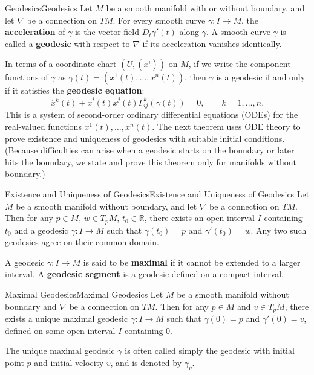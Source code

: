 \documentclass[../main.tex]{subfiles}
\begin{document}
\begin{definition}{Geodesics}{Geodesics}
	Let $M$ be a smooth manifold with or without boundary, and let $\nabla$ be a connection on $TM$. For every smooth curve $\gamma: I \to M$, the \textbf{acceleration} of $\gamma$ is the vector field $D_t \gamma'(t)$ along $\gamma$. A smooth curve $\gamma$ is called a \textbf{geodesic} with respect to $\nabla$ if its acceleration vanishes identically.
\end{definition}
In terms of a coordinate chart $(U, (x^i))$ on $M$, if we write the component functions of $\gamma$ as $\gamma(t) = (x^1(t), \ldots, x^n(t))$, then $\gamma$ is a geodesic if and only if it satisfies the \textbf{geodesic equation}:
\begin{equation}
	\ddot{x}^k(t) + \dot{x}^i(t) \dot{x}^j(t) \Gamma_{ij}^k(\gamma(t)) = 0, \qquad k = 1, \ldots, n.
\end{equation}
This is a system of second-order ordinary differential equations (ODEs) for the real-valued functions $x^1(t), \ldots, x^n(t)$. The next theorem uses ODE theory to prove existence and uniqueness of geodesics with suitable initial conditions. (Because difficulties can arise when a geodesic starts on the boundary or later hits the boundary, we state and prove this theorem only for manifolds without boundary.) 

\begin{theorem}{Existence and Uniqueness of Geodesics}{Existence and Uniqueness of Geodesics}
	Let $M$ be a smooth manifold without boundary, and let $\nabla$ be a connection on $TM$. Then for any $p \in M$, $w \in T_pM$, $t_0 \in \mathbb{R}$, there exists an open interval $I$ containing $t_0$ and a geodesic $\gamma: I \to M$ such that $\gamma(t_0) = p$ and $\gamma'(t_0) = w$. Any two such geodesics agree on their common domain.
\end{theorem}

A geodesic $\gamma: I \to M$ is said to be \textbf{maximal} if it cannot be extended to a larger interval. A \textbf{geodesic segment} is a geodesic defined on a compact interval.

\begin{corollary}{Maximal Geodesics}{Maximal Geodesics}
	Let $M$ be a smooth manifold without boundary and $\nabla$ be a connection on $TM$. Then for any $p \in M$ and $v \in T_pM$, there exists a unique maximal geodesic $\gamma: I \to M$ such that $\gamma(0) = p$ and $\gamma'(0) = v$, defined on some open interval $I$ containing $0$.
\end{corollary}
The unique maximal geodesic $\gamma$ is often called simply the geodesic with initial point $p$ and initial velocity $v$, and is denoted by $\gamma_v$.
\end{document}
